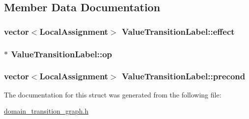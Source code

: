 \subsection{Member Data Documentation}
\hypertarget{structValueTransitionLabel_ab1874d03f64a1fa7aa681c3d17df0d78}{
\subsubsection[{effect}]{\setlength{\rightskip}{0pt plus 5cm}vector$<${\bf Local\-Assignment}$>$ Value\-Transition\-Label\-::effect}}\label{structValueTransitionLabel_ab1874d03f64a1fa7aa681c3d17df0d78}
\hypertarget{structValueTransitionLabel_aca6a9593c0edcdccbb3cfbf1b05ab6e6}{
\subsubsection[{op}]{$\ast$ Value\-Transition\-Label\-::op}}\label{structValueTransitionLabel_aca6a9593c0edcdccbb3cfbf1b05ab6e6}
\hypertarget{structValueTransitionLabel_a523b4e337d6a7eb2db8e74932dae57f9}{
\subsubsection[{precond}]{\setlength{\rightskip}{0pt plus 5cm}vector$<${\bf Local\-Assignment}$>$ Value\-Transition\-Label\-::precond}}\label{structValueTransitionLabel_a523b4e337d6a7eb2db8e74932dae57f9}


The documentation for this struct was generated from the following file\-:\begin{DoxyCompactItemize}
\item 
\hyperlink{domain__transition__graph_8h}{domain\-\_\-transition\-\_\-graph.\-h}\end{DoxyCompactItemize}

